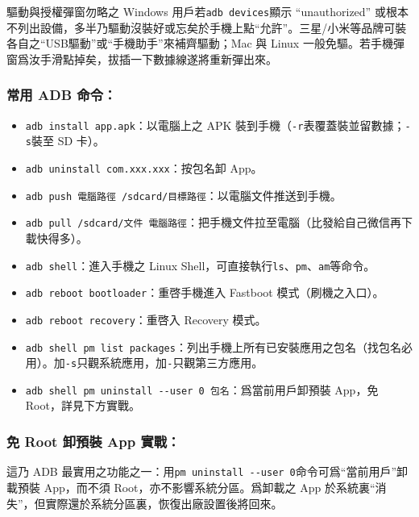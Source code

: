 \begin{tcbwarn}{驅動與授權彈窗勿略之}
Windows 用戶若\texttt{adb devices}顯示 “unauthorized” 或根本不列出設備，多半乃驅動沒裝好或忘矣於手機上點“允許”。三星/小米等品牌可裝各自之“USB驅動”或“手機助手”來補齊驅動；Mac 與 Linux 一般免驅。若手機彈窗爲汝手滑點掉矣，拔插一下數據線遂將重新彈出來。

\end{tcbwarn}

\subsubsection*{常用 ADB 命令：}

\begin{itemize}
  \item \texttt{adb install app.\allowbreak apk}：以電腦上之 APK 裝到手機（\texttt{-\allowbreak r}表覆蓋裝並留數據；\texttt{-\allowbreak s}裝至 SD 卡）。
  \item \texttt{adb uninstall com.\allowbreak xxx.\allowbreak xxx}：按包名卸 App。
  \item \texttt{adb push 電腦路徑 /\allowbreak sdcard/\allowbreak 目標路徑}：以電腦文件推送到手機。
  \item \texttt{adb pull /\allowbreak sdcard/\allowbreak 文件 電腦路徑}：把手機文件拉至電腦（比發給自己微信再下載快得多）。
  \item \texttt{adb shell}：進入手機之 Linux Shell，可直接執行\texttt{ls}、\texttt{pm}、\texttt{am}等命令。
  \item \texttt{adb reboot bootloader}：重啓手機進入 Fastboot 模式（刷機之入口）。
  \item \texttt{adb reboot recovery}：重啓入 Recovery 模式。
  \item \texttt{adb shell pm list packages}：列出手機上所有已安裝應用之包名（找包名必用）。加\texttt{-\allowbreak s}只觀系統應用，加\texttt{-}只觀第三方應用。
  \item \texttt{adb shell pm uninstall -\allowbreak -\allowbreak user 0 包名}：爲當前用戶卸預裝 App，免 Root，詳見下方實戰。
\end{itemize}

\subsubsection*{免 Root 卸預裝 App 實戰：}

這乃 ADB 最實用之功能之一：用\texttt{pm uninstall -\allowbreak -\allowbreak user 0}命令可爲“當前用戶”卸載預裝 App，而不須 Root，亦不影響系統分區。爲卸載之 App 於系統裏“消失”，但實際還於系統分區裏，恢復出廠設置後將回來。

